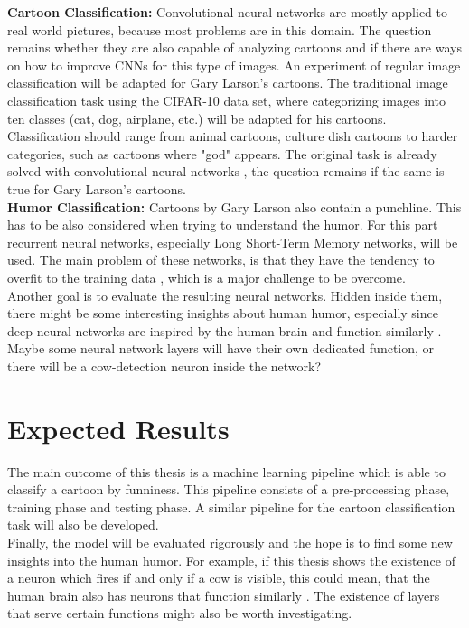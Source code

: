 \documentclass[draft,final]{vutinfth} %
\begin{document}
\textbf {Cartoon Classification:} \quad Convolutional neural networks are mostly applied to real world pictures, because most problems are in this domain. The question remains whether they are also capable of analyzing cartoons and if there are ways on how to improve CNNs for this type of images. An experiment of regular image classification will be adapted for Gary Larson's cartoons. The traditional image classification task using the CIFAR-10 data set, where categorizing images into ten classes (cat, dog, airplane, etc.) will be adapted for his cartoons. Classification should range from animal cartoons, culture dish cartoons to harder categories, such as cartoons where "god" appears. The original task is already solved with convolutional neural networks \cite{dogsvscats}, the question remains if the same is true for Gary Larson's cartoons. \\

\textbf {Humor Classification:} \quad Cartoons by Gary Larson also contain a punchline. This has to be also considered when trying to understand the humor. For this part recurrent neural networks, especially Long Short-Term Memory networks, will be used. The main problem of these networks, is that they have the tendency to overfit to the training data \cite[page 4]{reviewRNN}, which is a major challenge to be overcome. \\

Another goal is to evaluate the resulting neural networks. Hidden inside them, there might be some interesting insights about human humor, especially since deep neural networks are inspired by the human brain and function similarly \cite{Cichy2016}. Maybe some neural network layers will have their own dedicated function, or there will be a cow-detection neuron inside the network? 

\chapter{Expected Results}

The main outcome of this thesis is a machine learning pipeline which is able to classify a cartoon by funniness. This pipeline consists of a pre-processing phase, training phase and testing phase. A similar pipeline for the cartoon classification task will also be developed. \\

Finally, the model will be evaluated rigorously and the hope is to find some new insights into the human humor. For example, if this thesis shows the existence of a neuron which fires if and only if a cow is visible, this could mean, that the human brain also has neurons that function similarly \cite{Cichy2016}. The existence of layers that serve certain functions might also be worth investigating. \\
\end{document}

